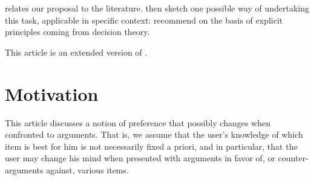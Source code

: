 \documentclass[version=3.21, pagesize, twoside=off, bibliography=totoc, DIV=calc, fontsize=12pt, a4paper, french, english]{scrartcl}
\begin{document}
 relates our proposal to the literature.  then sketch one possible way of undertaking this task, applicable in specific context: recommend on the basis of explicit principles coming from decision theory. 

This article is an extended version of \citet{cailloux_learning_2018}.

\section{Motivation}
\label{sec:motiv}
This article discusses a notion of preference that possibly changes when confronted to arguments. That is, we assume that the user’s knowledge of which item is best for him is not necessarily fixed a priori, and in particular, that the user may change his mind  when presented with arguments in favor of, or counter-arguments against, various items. 
\end{document}
